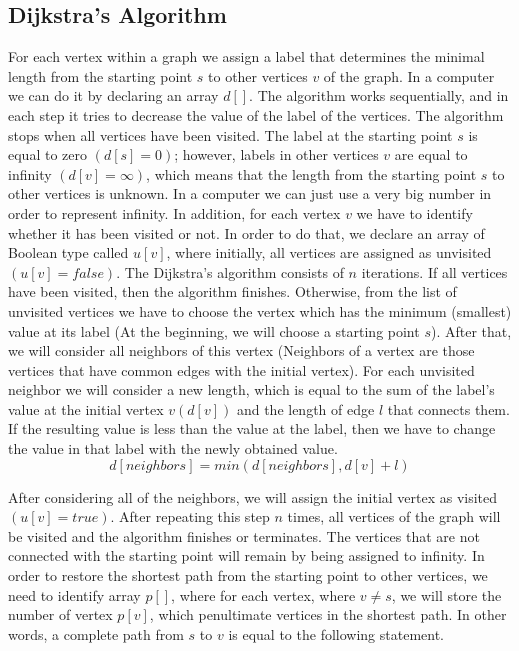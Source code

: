 \subsection{Dijkstra's Algorithm}
For each vertex within a graph we assign a label that determines the minimal length from the starting point $s$ to other vertices $v$ of the graph. In a computer we can do it by declaring an array $d[]$. The algorithm works sequentially, and in each step it tries to decrease the value of the label of the vertices. The algorithm stops when all vertices have been visited. The label at the starting point $s$ is equal to zero $(d[s] = 0)$; however, labels in other vertices $v$ are equal to infinity $(d[v] =\infty)$, which means that the length from the starting point $s$ to other vertices is unknown. In a computer we can just use a very big number in order to represent infinity. In addition, for each vertex $v$ we have to identify whether it has been visited or not. In order to do that, we declare an array of Boolean type called $u[v]$, where initially, all vertices are assigned as unvisited $(u[v] = false)$. The Dijkstra’s algorithm consists of $n$ iterations. If all vertices have been visited, then the algorithm finishes. Otherwise, from the list of unvisited vertices we have to choose the vertex which has the minimum (smallest) value at its label (At the beginning, we will choose a starting point $s$). After that, we will consider all neighbors of this vertex (Neighbors of a vertex are those vertices that have common edges with the initial vertex). For each unvisited neighbor we will consider a new length, which is equal to the sum of the label’s value at the initial vertex $v (d[v])$ and the length of edge $l$ that connects them. If the resulting value is less than the value at the label, then we have to change the value in that label with the newly obtained value\cite{magzhan2013review}.
\begin{equation}\label{finding-minimum-neighbour-in-dijkstra}
	d [ neighbors ] = min ( d [ neighbors ] , d[ v ] + l )
\end{equation}

After considering all of the neighbors, we will assign the initial vertex as visited $(u[v] = true)$. After repeating this step $n$ times, all vertices of the graph will be visited and the algorithm finishes or terminates. The vertices that are not connected with the starting point will remain by being assigned to infinity. In order to restore the shortest path from the starting point to other vertices, we need to identify array $p []$, where for each vertex, where $v \neq s$, we will store the number of vertex $p[v]$, which penultimate vertices in the shortest path. In other words, a complete path from $s$ to $v$ is equal to the following statement.

